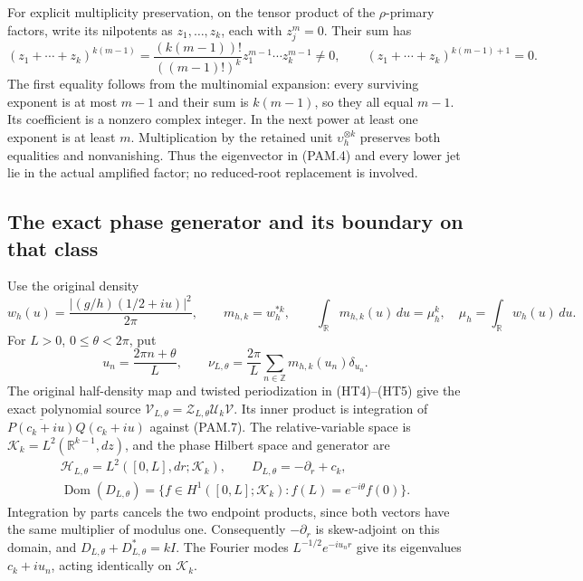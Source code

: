 For explicit multiplicity preservation, on the tensor product of the
\(\rho\)-primary factors, write its nilpotents as \(z_1,\ldots,z_k\),
each with \(z_j^m=0\). Their sum has
\[
 (z_1+\cdots+z_k)^{k(m-1)}
 =\frac{(k(m-1))!}{((m-1)!)^k}
                 z_1^{m-1}\cdots z_k^{m-1}\ne0,\qquad
 (z_1+\cdots+z_k)^{k(m-1)+1}=0.
 \tag{PAM.5}\label{CFStage:eq:pam-nilpotents}
\]
The first equality follows from the multinomial expansion: every
surviving exponent is at most \(m-1\) and their sum is \(k(m-1)\),
so they all equal \(m-1\). Its coefficient is a nonzero complex
integer. In the next power at least one exponent is at least \(m\).
Multiplication by the retained unit \(\upsilon_h^{\otimes k}\)
preserves both equalities and nonvanishing. Thus the eigenvector
in (PAM.4) and every lower jet lie in the actual amplified factor;
no reduced-root replacement is involved.

\subsection{The exact phase generator and its boundary on that class}

Use the original density
\[
 w_h(u)=\frac{|(g/h)(1/2+iu)|^2}{2\pi},\qquad
 m_{h,k}=w_h^{*k},\qquad
 \int_{\mathbb R}m_{h,k}(u)\,du=\mu_h^k,\quad
 \mu_h=\int_{\mathbb R}w_h(u)\,du .
 \tag{PAM.6}\label{CFStage:eq:pam-density}
\]
For \(L>0\), \(0\le\theta<2\pi\), put
\[
 u_n=\frac{2\pi n+\theta}{L},\qquad
 \nu_{L,\theta}=\frac{2\pi}{L}
       \sum_{n\in\mathbb Z}m_{h,k}(u_n)\delta_{u_n}.
 \tag{PAM.7}\label{CFStage:eq:pam-phase}
\]
The original half-density map and twisted periodization in (HT4)--(HT5)
give the exact polynomial source
\(\mathcal V_{L,\theta}=\mathcal Z_{L,\theta}\mathcal U_k\mathcal V\).
Its inner product is integration of
\(\overline{P(c_k+iu)}Q(c_k+iu)\) against (PAM.7).
The relative-variable space is
\(\mathcal K_k=L^2(\mathbb R^{k-1},dz)\), and the phase Hilbert
space and generator are
\[
 \begin{gathered}
 \mathcal H_{L,\theta}
       =L^2([0,L],dr;\mathcal K_k),\qquad
 D_{L,\theta}=-\partial_r+c_k,\\
 \operatorname{Dom}(D_{L,\theta})
 =\{f\in H^1([0,L];\mathcal K_k):
                        f(L)=e^{-i\theta}f(0)\}.
 \end{gathered}
 \tag{PAM.8}\label{CFStage:eq:pam-generator}
\]
Integration by parts cancels the two endpoint products, since both
vectors have the same multiplier of modulus one. Consequently
\(-\partial_r\) is skew-adjoint on this domain, and
\(D_{L,\theta}+D_{L,\theta}^*=kI\).
The Fourier modes \(L^{-1/2}e^{-iu_nr}\) give its eigenvalues
\(c_k+iu_n\), acting identically on \(\mathcal K_k\).

